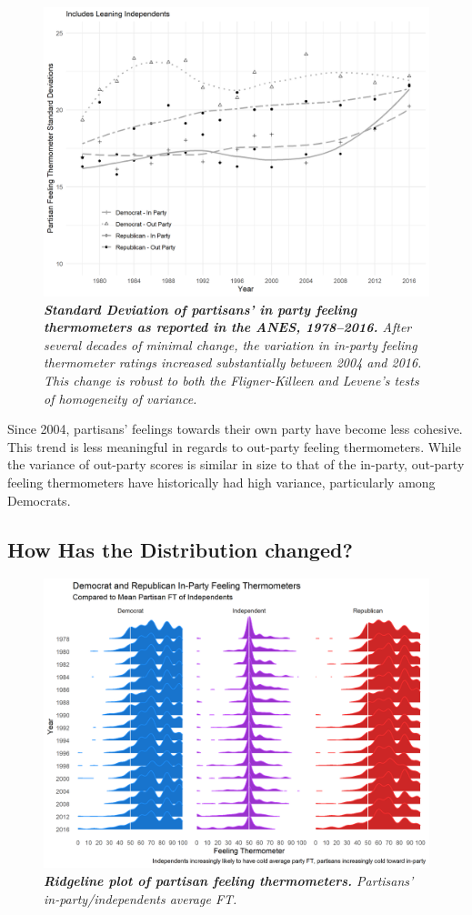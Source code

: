 \documentclass[12pt]{paper}
\begin{document}
\begin{figure}[H]
\center\includegraphics[width=5in]{cdf-sd-ns.png}
\caption{\label{fig:cdf-sd} \textit{\textbf{Standard Deviation of partisans' in party feeling thermometers as reported in the ANES, 1978--2016.} After several decades of minimal change, the variation in in-party feeling thermometer ratings increased substantially between 2004 and 2016. This change is robust to both the Fligner-Killeen and Levene's tests of homogeneity of variance.}}
\end{figure}

Since 2004, partisans' feelings towards their own party have become less cohesive. This trend is less meaningful in regards to out-party feeling thermometers. While  the variance of out-party scores is similar in size to that of the in-party, out-party feeling thermometers have historically had high variance, particularly among Democrats.

\subsection{How Has the Distribution changed?}
\begin{figure}[H]
\center\includegraphics[width=7in]{cdf-ridge-ns.png}
\caption{\label{fig:ridge} \textit{\textbf{Ridgeline plot of partisan feeling thermometers.} Partisans' in-party/independents average FT.}}
\end{figure}
\end{document}
